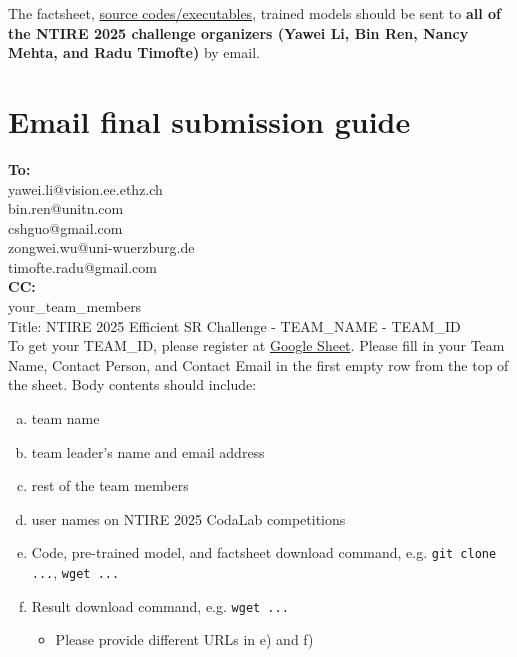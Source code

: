 \documentclass[10pt,twocolumn,letterpaper]{article}
\begin{document}
The factsheet, \href{https://github.com/Amazingren/NTIRE2025_ESR}{source codes/executables}, trained models should be sent to \textbf{all of the NTIRE 2025 challenge organizers (Yawei Li, Bin Ren, Nancy Mehta, and Radu Timofte)} by email.


\section{Email final submission guide}
\noindent \textbf{To:} \\
{yawei.li@vision.ee.ethz.ch} \\ 
{bin.ren@unitn.com} \\ 
{cshguo@gmail.com} \\
{zongwei.wu@uni-wuerzburg.de}\\
{timofte.radu@gmail.com}\\
\noindent \textbf{CC:} \\
your\_team\_members\\


Title: NTIRE 2025 Efficient SR Challenge - TEAM\_NAME - TEAM\_ID\\

To get your TEAM\_ID, please register at \href{https://docs.google.com/spreadsheets/d/11JuxcS78C6Gxc8B436L4Zk4_m5soHaTcw3cnF8h5ctE/edit?usp=sharing}{Google Sheet}. Please fill in your Team Name, Contact Person, and Contact Email in the first empty row from the top of the sheet.
% 
Body contents should include: 

\begin{enumerate}[a)]
    \item team name 
    
    \item team leader's name and email address 
    
    \item rest of the team members 
    
    \item user names on NTIRE 2025 CodaLab competitions 
    
    \item Code, pre-trained model, and factsheet download command, e.g. \texttt{git clone ...}, \texttt{wget ...}
    
    \item Result download command, e.g. \texttt{wget ...}
    
    \begin{itemize}
        \item Please provide different URLs in e) and f)
    \end{itemize}
\end{enumerate}
\end{document}
